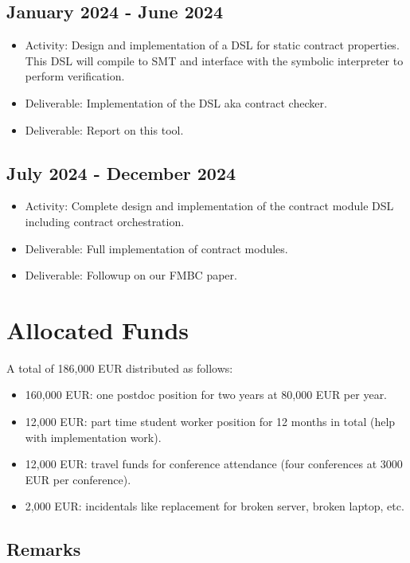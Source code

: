 \documentclass[a4paper,11pt]{article}
\begin{document}
\subsection{January 2024 - June 2024}
\label{sec:january-2024-june}

\begin{itemize}
\item Activity: Design and implementation of a DSL for static contract properties. This DSL will compile to SMT and interface with the symbolic interpreter to perform verification.  
\item Deliverable: Implementation of the DSL aka contract checker.
\item Deliverable: Report on this tool.
\end{itemize}

\subsection{July 2024 - December 2024}
\label{sec:july-2024-december}

\begin{itemize}
\item Activity: Complete design and implementation of the contract module DSL including contract orchestration. 
\item Deliverable: Full implementation of contract modules.
\item Deliverable: Followup on our FMBC paper. 
\end{itemize}


\section{Allocated Funds}
\label{sec:allocated-funds}

A total of 186,000 EUR distributed as follows:
\begin{itemize}
\item 160,000 EUR: one postdoc position for two years at 80,000 EUR per year.
\item 12,000 EUR: part time student worker position for 12 months in total (help with implementation work).
\item 12,000 EUR: travel funds for conference attendance (four conferences at 3000 EUR per conference). 
\item 2,000 EUR: incidentals like replacement for broken server, broken laptop, etc.
\end{itemize}

\subsection{Remarks}
\label{sec:remarks}
\end{document}
